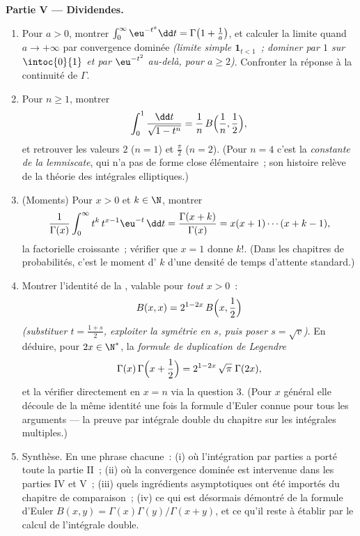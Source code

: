 \begin{problem}
\medskip
\noindent\textbf{Partie V --- Dividendes.}
\begin{enumerate}[resume]
  \item Pour $a > 0$, montrer $\int_0^\infty \eu^{-t^a}\dd t =
        \Gamma\bigl(1 + \frac1a\bigr)$, et calculer la limite quand
        $a \to +\infty$ par convergence dominée \emph{(limite simple
        $\mathbf 1_{t < 1}$~; dominer par $1$ sur
        $\intoc{0}{1}$ et par $\eu^{-t^2}$ au-delà, pour $a \geq
        2$)}. Confronter la réponse à la continuité de
        $\Gamma$.
  \item Pour $n \geq 1$, montrer
        \[
        \int_0^1 \frac{\dd t}{\sqrt{1 - t^n}}
        = \frac1n\,B\Bigl(\frac1n, \frac12\Bigr),
        \]
        et retrouver les valeurs $2$ ($n = 1$) et $\frac\pi2$ ($n
        = 2$). (Pour $n = 4$ c'est la \emph{constante de la
        lemniscate}, qui n'a pas de forme close élémentaire~; son
        histoire relève de la théorie des intégrales elliptiques.)
  \item (Moments) Pour $x > 0$ et $k \in \N$, montrer
        \[
        \frac{1}{\Gamma(x)}\int_0^\infty
        t^{k}\,t^{x-1}\eu^{-t}\,\dd t
        = \frac{\Gamma(x+k)}{\Gamma(x)}
        = x(x+1)\cdots(x+k-1),
        \]
        la factorielle croissante~; vérifier que $x = 1$ donne $k!$. (Dans
        les chapitres de probabilités, c'est le moment d' $k$ d'une
        densité de temps d'attente standard.)
  \item Montrer l'identité de la , valable pour \emph{tout} $x > 0$~:
        \[
        B(x, x) = 2^{1-2x}\,B\Bigl(x, \frac12\Bigr)
        \]
        \emph{(substituer $t = \frac{1+s}2$, exploiter la
        symétrie en $s$, puis poser $s = \sqrt v$)}. En déduire, pour
        $2x \in \N^*$, la \emph{formule de duplication de Legendre}
        \[
        \Gamma(x)\,\Gamma\Bigl(x + \frac12\Bigr)
        = 2^{1-2x}\,\sqrt\pi\;\Gamma(2x),
        \]
        et la vérifier directement en $x = n$ via la question 3. (Pour
        $x$ général elle découle de la même identité une fois
        la formule d'Euler connue pour tous les arguments --- la preuve par
        intégrale double du chapitre sur les intégrales multiples.)
  \item Synthèse. En une phrase chacune~: (i) où l'intégration
        par parties a porté toute la partie II~; (ii) où
        la convergence dominée est intervenue dans les parties IV et V~; (iii) quels
        ingrédients asymptotiques ont été importés du chapitre de
        comparaison~; (iv) ce qui est désormais démontré de la formule d'Euler
        $B(x,y) = \Gamma(x)\Gamma(y)/\Gamma(x+y)$, et ce qu'il
        reste à établir par le calcul de l'intégrale double.
\end{enumerate}
\end{problem}
